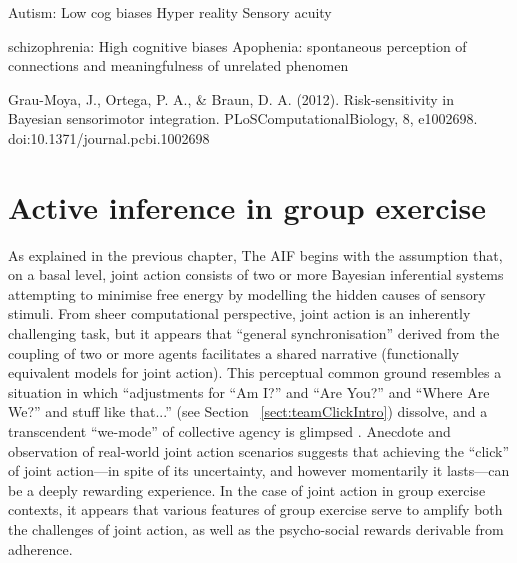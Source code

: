 \begin{CJK}{UTF8}{gbsn}
    Autism:
    Low cog biases
    Hyper reality
    Sensory acuity

    schizophrenia:
    High cognitive biases
    Apophenia: spontaneous perception of connections and meaningfulness of unrelated phenomen


    Grau-Moya, J., Ortega, P. A., & Braun, D. A. (2012). Risk-sensitivity in Bayesian sensorimotor integration. PLoSComputationalBiology, 8, e1002698. doi:10.1371/journal.pcbi.1002698
































\section{Active inference in group exercise \label{sect:activeInfGE}}

   As explained in the previous chapter, The AIF begins with the assumption that, on a basal level, joint action consists of two or more Bayesian inferential systems attempting to minimise free energy by modelling the hidden causes of sensory stimuli.  From sheer computational perspective, joint action is an inherently challenging task, but it appears that ``general synchronisation'' derived from the coupling of two or more agents facilitates a shared narrative (functionally equivalent models for joint action).  This perceptual common ground resembles a situation in which ``adjustments for ``Am I?'' and ``Are You?'' and ``Where Are We?'' and stuff like that...'' (see Section ~\ref{sect:teamClickIntro}) dissolve, and a transcendent ``we-mode'' of collective agency is glimpsed \citep[][]{Friston2015}.  Anecdote and observation of real-world joint action scenarios suggests that achieving the ``click'' of joint action---in spite of its uncertainty, and however momentarily it lasts---can be a deeply rewarding experience.  In the case of joint action in group exercise contexts, it appears that various features of group exercise serve to amplify both the challenges of joint action, as well as the psycho-social rewards derivable from adherence.


\end{CJK}
